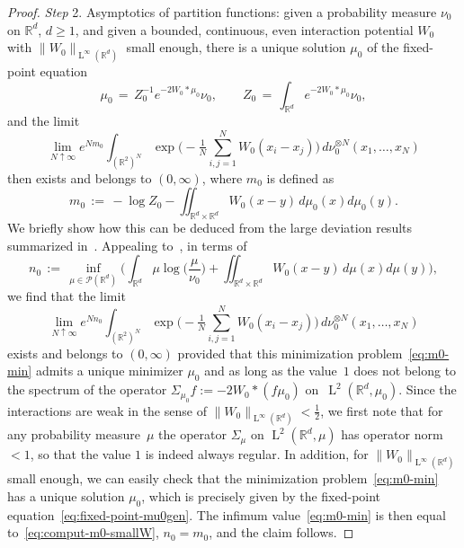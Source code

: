 \documentclass[a4paper,11pt,reqno,noindent]{amsart}
\theoremstyle{plain}
\numberwithin{equation}{section}
\newcommand{\R}{\mathbb R}
\newcommand{\Pc}{\mathcal P}
\newcommand{\3}{|\!|\!|}
\newcommand{\Ld}{\operatorname{L}}
\newcommand{\step}[1]{\noindent \textit{Step} #1.}
\begin{document}
\begin{proof}
\medskip
\step2 Asymptotics of partition functions:
given a probability measure $\nu_0$ on $\R^d$, $d\ge1$, and given a bounded, continuous, even interaction potential $W_0$ with \mbox{$\|W_0\|_{\Ld^\infty(\R^d)}$} small enough,
there is a unique solution $\mu_0$ of the fixed-point equation
\begin{equation}\label{eq:fixed-point-mu0gen}
\mu_0\,=\,Z_0^{-1}e^{-2W_0\ast\mu_0}\nu_0,\qquad Z_0\,=\,\int_{\R^d}e^{-2W_0\ast\mu_0}\nu_0,
\end{equation}
and the limit
\[\lim_{N\uparrow\infty}e^{Nm_0}\int_{(\R^2)^N}\exp\bigg(-\tfrac1{N}\sum_{i,j=1}^NW_0(x_i-x_j)\bigg)\,d\nu_0^{\otimes N}(x_1,\ldots,x_N)\]
then exists and belongs to $(0,\infty)$,
where $m_0$ is defined as
\begin{equation}\label{eq:comput-m0-smallW}
m_0\,:=\,-\log Z_0-\iint_{\R^d\times\R^d}W_0(x-y)\,d\mu_0(x)d\mu_0(y).
\end{equation}
We briefly show how this can be deduced from the large deviation results summarized in~\cite{Benarous-Brunaud-90}.
Appealing to~\cite[Theorem~B(ii)]{Benarous-Brunaud-90},
in terms of
\begin{equation}\label{eq:m0-min}
n_0\,:=\,\inf_{\mu\in\Pc(\R^d)}\bigg(\int_{\R^d}\mu\log\Big(\frac\mu{\nu_0}\Big)+\iint_{\R^d\times\R^d}W_0(x-y)\,d\mu(x)d\mu(y)\bigg),
\end{equation}
we find that the limit
\[\lim_{N\uparrow\infty}e^{Nn_0}\int_{(\R^2)^N}\exp\bigg(-\tfrac1{N}\sum_{i,j=1}^NW_0(x_i-x_j)\bigg)\,d\nu_0^{\otimes N}(x_1,\ldots,x_N)\]
exists and belongs to $(0,\infty)$
provided that this minimization problem~\eqref{eq:m0-min} admits a unique minimizer $\mu_0$ and {as long as} the value~$1$ does not belong to the spectrum of the operator $\Sigma_{\mu_0}f:=-2 W_0\ast(f\mu_0)$ on~$\Ld^2(\R^d,\mu_0)$.
{Since the} interactions are weak in the sense of $\|W_0\|_{\Ld^\infty(\R^d)}<\frac12$, we first note that for any probability measure~$\mu$ the operator $\Sigma_{\mu}$ on $\Ld^2(\R^d,\mu)$ has operator norm $<1$, so that the value $1$ is indeed always regular.
In addition, for $\|W_0\|_{\Ld^\infty(\R^d)}$ small enough, we can easily check that the minimization problem~\eqref{eq:m0-min} has a unique solution $\mu_0$, which is precisely given by the fixed-point equation~\eqref{eq:fixed-point-mu0gen}. The infimum value~\eqref{eq:m0-min} is then equal to~\eqref{eq:comput-m0-smallW}, $n_0=m_0$, and the claim follows.


\end{proof}
\end{document}
